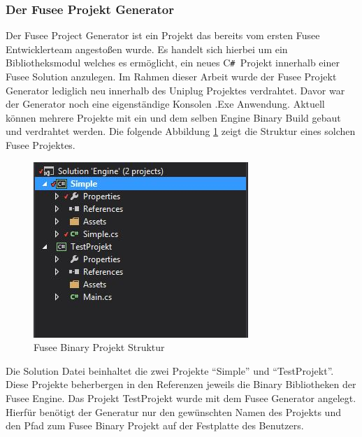 \documentclass[pagesize, paper=a4, fontsize=12pt, titlepage=true, headings=small, headnosepline, abstractoff, liststotoc, nochapterprefix, plainheadsepline, twoside]{scrreprt}
\newcommand{\CSS}{C\texttt{\# }}
\begin{document}
\subsubsection{Der Fusee Projekt Generator}
Der Fusee Project Generator ist ein Projekt das bereits vom ersten Fusee Entwicklerteam angestoßen wurde. Es  handelt sich hierbei um ein Bibliotheksmodul welches es ermöglicht, ein neues \CSS Projekt innerhalb einer Fusee Solution anzulegen. Im Rahmen dieser Arbeit wurde der Fusee Projekt Generator lediglich neu innerhalb des Uniplug Projektes verdrahtet. Davor war der Generator noch eine eigenständige Konsolen .Exe Anwendung. Aktuell können mehrere Projekte mit ein und dem selben Engine Binary Build gebaut und verdrahtet werden. Die folgende Abbildung \ref{FuseeBinaryProjektStruktur} zeigt die Struktur eines solchen Fusee Projektes.
\begin{figure}[ht]
	\centering
	\includegraphics[width=\linewidth/2]{Bilder/FuseeBinaryProjekt.jpg}
	\caption{Fusee Binary Projekt Struktur}
	\label{FuseeBinaryProjektStruktur}
\end{figure}
 Die Solution Datei beinhaltet die zwei Projekte “Simple” und “TestProjekt”. Diese Projekte beherbergen in den Referenzen jeweils die Binary Bibliotheken der Fusee Engine. Das Projekt TestProjekt wurde mit dem Fusee Generator angelegt. Hierfür benötigt der Generatur nur den gewünschten Namen des Projekts und den Pfad zum Fusee Binary Projekt auf der Festplatte des Benutzers.
\end{document}
